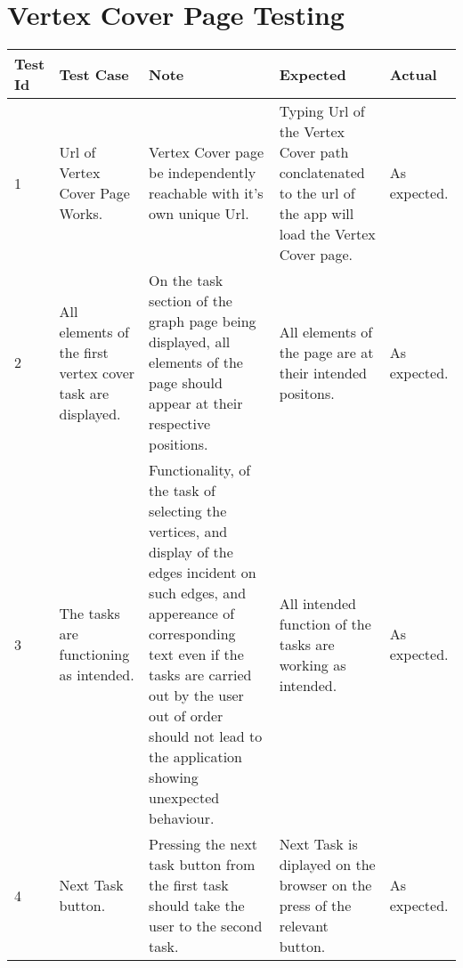 \section{Vertex Cover Page Testing}
\begin{tabular}{ |p{1cm}|p{2cm}|p{4cm}|p{2cm}|p{2cm}| }
 \hline
 \textbf{Test Id} & \textbf{Test Case} & \textbf{Note} & \textbf{Expected} & \textbf{Actual} \\
 \hline
 1 
 & Url of Vertex Cover Page Works. 
 & Vertex Cover page be independently reachable with it's own unique
   Url.
 & Typing Url of the Vertex Cover path conclatenated to the url of the app will load the
   Vertex Cover page.
 & As expected. \\
 \hline
 2 
 & All elements of the first vertex cover task are displayed.
 & On the task section of the graph page being displayed, all elements of
   the page should appear at their respective positions.
 & All elements of the page are at their intended positons.
 & As expected. \\
 \hline
 3 
 & The tasks are functioning as intended. 
 & Functionality, of the task of selecting the vertices, and display of the
 edges incident on such edges, and appereance of corresponding text even if the
 tasks are carried out by the user out of order should not lead to the
 application showing unexpected behaviour.
 & All intended function of the tasks are working as intended. 
 & As expected. \\
 \hline
 4 
 & Next Task button.
 & Pressing the next task button from the first task
   should take the user to the second task.
 & Next Task is diplayed on the browser on the press of the relevant button.
 & As expected. \\
 \hline
\end{tabular}

